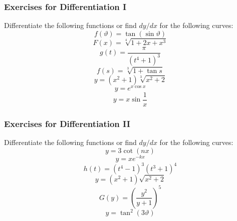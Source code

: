 \documentclass[xcolor=dvipsnames]{beamer}
\begin{document}
\begin{frame}
  \frametitle{Exercises for Differentiation I}
Differentiate the following functions or find $dy/dx$ for the
following curves:
\begin{equation}
  \label{eq:pimexeiz}
  f(\vartheta)=\tan(\sin{}\vartheta)
\end{equation}
\begin{equation}
  \label{eq:oogheica}
  F(x)=\sqrt[4]{1+2x+x^{3}}
\end{equation}
\begin{equation}
  \label{eq:ibagheab}
  g(t)=\frac{\pi}{(t^{4}+1)^{3}}
\end{equation}
\begin{equation}
  \label{eq:oboohoca}
  f(s)=\sqrt[3]{1+\tan{}s}
\end{equation}
\begin{equation}
  \label{eq:choopaib}
  y=(x^{2}+1)\sqrt[3]{x^{2}+2}
\end{equation}
\begin{equation}
  \label{eq:uosiamei}
y=e^{x\cos{}x}  
\end{equation}
\begin{equation}
  \label{eq:oshaiphu}
  y=x\sin\frac{1}{x}
\end{equation}
\end{frame}

\begin{frame}
  \frametitle{Exercises for Differentiation II}
Differentiate the following functions or find $dy/dx$ for the
following curves:
\begin{equation}
  \label{eq:ciukaech}
  y=3\cot(nx)
\end{equation}
\begin{equation}
  \label{eq:oveagooy}
  y=xe^{-kx}
\end{equation}
\begin{equation}
  \label{eq:veeveema}
  h(t)=(t^{4}-1)^{3}(t^{3}+1)^{4}
\end{equation}
\begin{equation}
  \label{eq:athaazui}
  y=(x^{2}+1)\sqrt{x^{2}+2}
\end{equation}
\begin{equation}
  \label{eq:ahgoovim}
  G(y)=\left(\frac{y^{2}}{y+1}\right)^{5}
\end{equation}
\begin{equation}
  \label{eq:gaidaime}
  y=\tan^{2}(3\vartheta)
\end{equation}
\end{frame}
\end{document}
